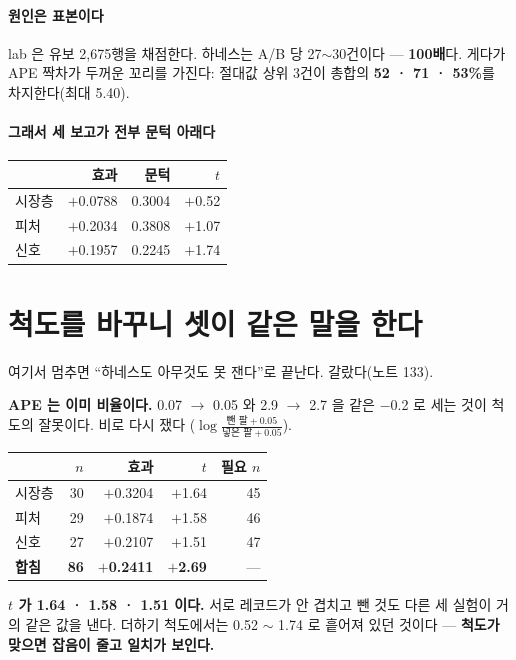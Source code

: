 \documentclass[10pt]{article}
\begin{document}
\paragraph{원인은 표본이다} lab 은 유보 2,675행을 채점한다. 하네스는 A/B 당
27$\sim$30건이다 --- \textbf{100배}다. 게다가 APE 짝차가 두꺼운 꼬리를 가진다:
절대값 상위 3건이 총합의 \textbf{52 · 71 · 53\%}를 차지한다(최대 5.40).

\paragraph{그래서 세 보고가 전부 문턱 아래다}

\begin{center}\small
\begin{tabular}{lrrr}
\hline
& 효과 & 문턱 & $t$ \\
\hline
시장층 & $+$0.0788 & 0.3004 & $+$0.52 \\
피처 & $+$0.2034 & 0.3808 & $+$1.07 \\
신호 & $+$0.1957 & 0.2245 & $+$1.74 \\
\hline
\end{tabular}
\end{center}

\section{척도를 바꾸니 셋이 같은 말을 한다}

여기서 멈추면 ``하네스도 아무것도 못 잰다''로 끝난다. 갈랐다(노트 133).

\textbf{APE 는 이미 비율이다.} 0.07 $\to$ 0.05 와 2.9 $\to$ 2.7 을 같은
$-$0.2 로 세는 것이 척도의 잘못이다. 비로 다시 쟀다
($\log\frac{\text{뺀 팔}+0.05}{\text{넣은 팔}+0.05}$).

\begin{center}\small
\begin{tabular}{lrrrr}
\hline
& $n$ & 효과 & $t$ & 필요 $n$ \\
\hline
시장층 & 30 & $+$0.3204 & $+$1.64 & 45 \\
피처 & 29 & $+$0.1874 & $+$1.58 & 46 \\
신호 & 27 & $+$0.2107 & $+$1.51 & 47 \\
\hline
\textbf{합침} & \textbf{86} & \textbf{$+$0.2411} & \textbf{$+$2.69} & --- \\
\hline
\end{tabular}
\end{center}

\textbf{$t$ 가 1.64 · 1.58 · 1.51 이다.} 서로 레코드가 안 겹치고 뺀 것도
다른 세 실험이 거의 같은 값을 낸다. 더하기 척도에서는 0.52 $\sim$ 1.74 로
흩어져 있던 것이다 --- \textbf{척도가 맞으면 잡음이 줄고 일치가 보인다.}
\end{document}
